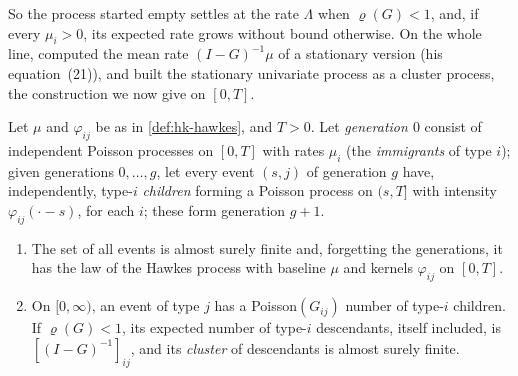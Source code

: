 So the process started empty settles at the rate $\Lambda$ when $\varrho(G)<1$, and, if every $\mu_i>0$, its expected
rate grows without bound otherwise. On the whole line, \textcite{hawkes-1971} computed the mean rate $(I-G)^{-1}\mu$ of a stationary
version (his equation~(21)), and \textcite{hawkes-oakes-1974} built the stationary univariate process as a cluster
process, the construction we now give on $[0,T]$.

\begin{proposition}\label{prop:hk-branching}
Let $\mu$ and $\varphi_{ij}$ be as in \cref{def:hk-hawkes}, and $T>0$. Let \emph{generation $0$} consist of
independent Poisson processes on $[0,T]$ with rates $\mu_i$ (the \emph{immigrants} of type $i$); given generations
$0,\dots,g$, let every event $(s,j)$ of generation $g$ have, independently, type-$i$ \emph{children} forming a
Poisson process on $(s,T]$ with intensity $\varphi_{ij}(\cdot-s)$, for each $i$; these form generation $g+1$.
\begin{enumerate}[label=(\roman*)]
  \item The set of all events is almost surely finite and, forgetting the generations, it has the law of the
    Hawkes process with baseline $\mu$ and kernels $\varphi_{ij}$ on $[0,T]$.
  \item On $[0,\infty)$, an event of type $j$ has a Poisson$(G_{ij})$ number of type-$i$ children. If
    $\varrho(G)<1$, its expected number of type-$i$ descendants, itself included, is $[(I-G)^{-1}]_{ij}$, and its
    \emph{cluster} of descendants is almost surely finite.
\end{enumerate}
\end{proposition}

